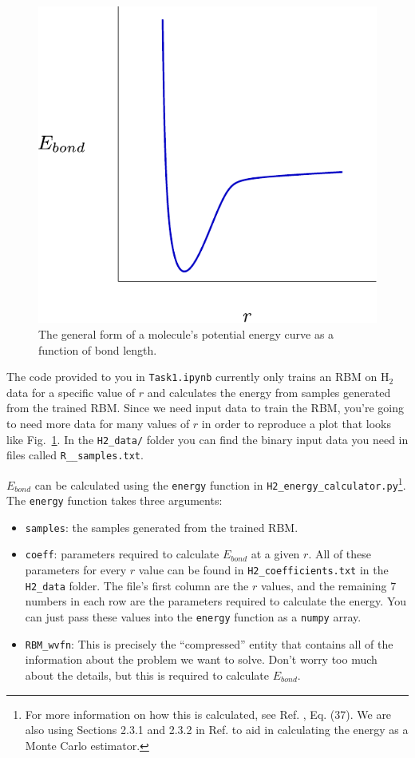 \documentclass[12pt]{article}
\begin{document}
\begin{figure}
    \begin{center}
        \includegraphics[width=0.4\linewidth]{../../figures/potential_energy_curve_vanilla.pdf}
    \end{center}
    \caption{The general form of a molecule's potential energy curve as a function of bond length.}
    \label{fig:potential_curve}
\end{figure}

The code provided to you in \texttt{Task1.ipynb} currently only trains an RBM on H$_2$ data for a specific value of $r$ and calculates the energy from samples generated from the trained RBM. Since we need input data to train the RBM, you're going to need more data for many values of $r$ in order to reproduce a plot that looks like Fig.~\ref{fig:potential_curve}. In the \texttt{H2\_data/} folder you can find the binary input data you need in files called \texttt{R\_<r value>\_samples.txt}. 

$E_{bond}$ can be calculated using the \texttt{energy} function in \texttt{H2\_energy\_calculator.py}\footnote{For more information on how this is calculated, see Ref.      \cite{xiaElectronicStructureCalculations2017}, Eq. (37). We are also using Sections 2.3.1 and 2.3.2 in Ref. \cite{beachQuCumberWavefunctionReconstruction2019} to aid in calculating the energy as a Monte Carlo estimator.}. The \texttt{energy} function takes three arguments: 

\begin{itemize}
    \item \texttt{samples}: the samples generated from the trained RBM.
    \item \texttt{coeff}: parameters required to calculate $E_{bond}$ at a given $r$. All of these parameters for every $r$ value can be found in \texttt{H2\_coefficients.txt} in the \texttt{H2\_data} folder. The file's first column are the $r$ values, and the remaining 7 numbers in each row are the parameters required to calculate the energy. You can just pass these values into the \texttt{energy} function as a \texttt{numpy} array. 
    \item \texttt{RBM\_wvfn}: This is precisely the ``compressed'' entity that contains all of the information about the problem we want to solve. Don't worry too much about the details, but this is required to calculate $E_{bond}$.
\end{itemize}
\end{document}
